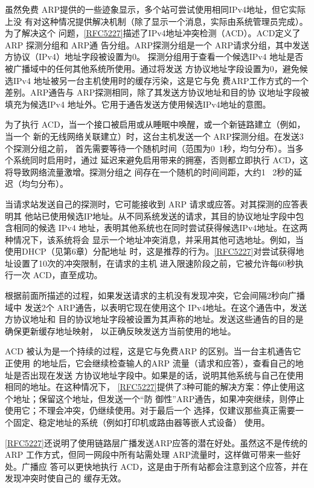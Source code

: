 虽然免费 ARP提供的一些迹象显示，多个站可尝试使用相同IPv4地址，但它实际上没
有对这种情况提供解决机制（除了显示一个消息，实际由系统管理员完成）。为了解决这个
问题，\href{https://www.rfc-editor.org/rfc/rfc5227}{[RFC5227]}描述了IPv4地址冲突检测（ACD）。ACD定义了 ARP 探测分组和 ARP通
告分组。ARP探测分组是一个 ARP请求分组，其中发送方协议（IPv4）地址字段被设置为0。
探测分组用于查看一个候选IPv4 地址是否被广播域中的任何其他系统所使用。通过将发送
方协议地址字段设置为0，避免候选IPv4 地址被另一台主机使用时的缓存污染，这是它与免
费ARP工作方式的一个差别。ARP通告与 ARP探测相同，除了其发送方协议地址和目的协
议地址字段被填充为候选IPv4 地址外。它用于通告发送方使用候选IPv4地址的意图。

为了执行 ACD，当一个接口被启用或从睡眠中唤醒，或一个新链路建立（例如，当一个
新的无线网络关联建立）时，这台主机发送一个 ARP探测分组。在发送3个探测分组之前，
首先需要等待一个随机时间（范围为0~1秒，均匀分布）。当多个系统同时启用时，通过
延迟来避免启用带来的拥塞，否则都立即执行 ACD，这将导致网络流量激增。探测分组之
间存在一个随机的时间间距，大约1 ~2秒的延迟（均匀分布）。

当请求站发送自己的探测时，它可能接收到 ARP 请求或应答。对其探测的应答表明其
他站已使用候选IP地址。从不同系统发送的请求，其目的协议地址字段中包含相同的候选
IPv4 地址，表明其他系统也在同时尝试获得候选IPv4地址。在这两种情况下，该系统将会
显示一个地址冲突消息，并采用其他可选地址。例如，当使用DHCP（见第6章）分配地址
时，这是推荐的行为。\href{https://www.rfc-editor.org/rfc/rfc5227}{[RFC5227]}对尝试获得地址设置了10次的冲突限制，在请求的主机
进入限速阶段之前，它被允许每60秒执行一次 ACD，直至成功。

根据前面所描述的过程，如果发送请求的主机没有发现冲突，它会间隔2秒向广播域中
发送2个 ARP通告，以表明它现在使用这个 IPv4地址。在这个通告中，发送方协议地址和
目的协议地址字段被设置为其声称的地址。发送这些通告的目的是确保更新缓存地址映射，
以正确反映发送方当前使用的地址。

ACD 被认为是一个持续的过程，这是它与免费ARP 的区别。当一台主机通告它正使用
的地址后，它会继续检查输人的ARP 流量（请求和应答），查看自己的地址是否出现在发送
方协议地址字段中。如果是的话，说明其他系统与自己在使用相同的地址。在这种情况下，
\href{https://www.rfc-editor.org/rfc/rfc5227}{[RFC5227]}提供了3种可能的解决方案：停止使用这个地址；保留这个地址，但发送一个“防
御性”ARP通告，如果冲突继续，则停止使用它；不理会冲突，仍继续使用。对于最后一个
选择，仅建议那些真正需要一个固定、稳定地址的系统（例如打印机或路由器等嵌人式设备）
使用。

\href{https://www.rfc-editor.org/rfc/rfc5227}{[RFC5227]}还说明了使用链路层广播发送ARP应答的潜在好处。虽然这不是传统的
ARP 工作方式，但同一网段中所有站需处理 ARP流量时，这样做可带来一些好处。广播应
答可以更快地执行 ACD，这是由于所有站都会注意到这个应答，并在发现冲突时使自己的
缓存无效。

